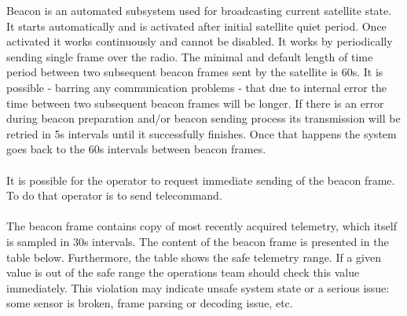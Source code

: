 
Beacon is an automated subsystem used for broadcasting current satellite state. It starts automatically and is activated after 
initial satellite quiet period. Once activated it works continuously and cannot be disabled. It works by periodically sending
single frame over the radio. The minimal and default length of time period between two subsequent beacon frames sent by the satellite is 
60s. It is possible - barring any communication problems - that due to internal error the time between two subsequent beacon 
frames will be longer. If there is an error during beacon preparation and/or beacon sending process its transmission will
be retried in 5s intervals until it successfully finishes. Once that happens the system goes back to the 60s intervals between
beacon frames. \\\\
It is possible for the operator to request immediate sending of the beacon frame. To do that operator is to send  
telecommand. \\\\
The beacon frame contains copy of most recently acquired telemetry, which itself is sampled in 30s intervals. The content 
of the beacon frame is presented in the table below. Furthermore, the table shows the safe telemetry range. If a given value is out of 
the safe range the operations team should check this value immediately. This violation may indicate unsafe system state or a serious issue: 
some sensor is broken, frame parsing or decoding issue, etc.

